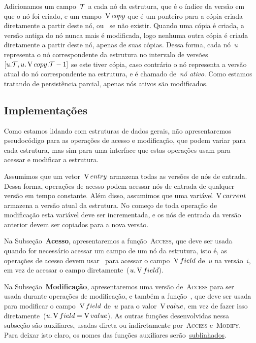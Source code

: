 \documentclass[main.tex]{subfiles}
\begin{document}
Adicionamos um campo~$\mathcal{T}$ a cada nó da estrutura, que é o índice da versão em que o nó foi criado, e um campo~$\operatorname{V}{copy}$ que é um ponteiro para a cópia criada diretamente a partir deste nó, ou~ se não existir. Quando uma cópia é criada, a versão antiga do nó nunca mais é modificada, logo nenhuma outra cópia é criada diretamente a partir deste nó, apenas de suas cópias. Dessa forma, cada nó~$u$ representa o nó correspondente da estrutura no intervalo de versões~${[u.\mathcal{T}, u.\operatorname{V}{copy}.\mathcal{T} - 1]}$ se este tiver cópia, caso contrário o nó representa a versão atual do nó correspondente na estrutura, e é chamado de~\emph{nó ativo}. Como estamos tratando de persistência parcial, apenas nós ativos são modificados.

\subsection{Implementações}

Como estamos lidando com estruturas de dados gerais, não apresentaremos pseudocódigo para as operações de acesso e modificação, que podem variar para cada estrutura, mas sim para uma interface que estas operações usam para acessar e modificar a estrutura.

\newcommand{\cur}{\V{current}}
Assumimos que um vetor~$\operatorname{V}{entry}$ armazena todas as versões de nós de entrada. Dessa forma, operações de acesso podem acessar nós de entrada de qualquer versão em tempo constante. Além disso, assumimos que uma variável~$\cur$ armazena a versão atual da estrutura. No começo de toda operação de modificação esta variável deve ser incrementada, e os nós de entrada da versão anterior devem ser copiados para a nova versão.

Na Subseção~\textbf{Acesso}, apresentaremos a função~\textsc{Access}, que deve ser usada quando for necessário acessar um campo de um nó da estrutura, isto é, as operações de acesso devem usar~\mbox{} para acessar o campo~$\operatorname{V}{field}$ de~$u$ na versão~$i$, em vez de acessar o campo diretamente~($u.\operatorname{V}{field}$).

\newcommand{\auxfunc}[1]{\underline{#1}}

Na Subseção~\textbf{Modificação}, apresentaremos uma versão de~\textsc{Access} para ser usada durante operações de modificação, e também a função~, que deve ser usada para modificar o campo~$\operatorname{V}{field}$ de~$u$ para o valor~$\operatorname{V}{value}$, em vez de fazer isso diretamente~($u.\operatorname{V}{field} = \operatorname{V}{value}$). As outras funções desenvolvidas nessa subseção são auxiliares, usadas direta ou indiretamente por~\mbox{\textsc{Access}} e~\textsc{Modify}. Para deixar isto claro, os nomes das funções auxiliares serão~\auxfunc{sublinhados}. %
\end{document}

